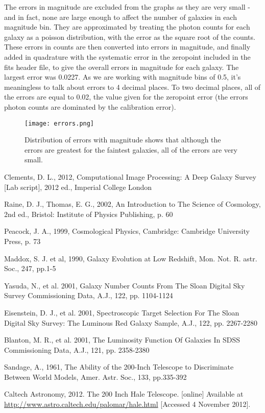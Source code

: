 \documentclass[a4paper,11pt,twoside]{article}
\begin{document}
The errors in magnitude are excluded from the graphs as they are very small - and in fact, none are large enough to affect the number of galaxies in each magnitude bin. 
They are approximated by treating the photon counts for each galaxy as a poisson distribution, with the error as the square root of the counts. These errors in counts are then converted into errors in magnitude, and finally added in quadrature with the systematic error in the zeropoint included in the fits header file, to give the overall errors in magnitude for each galaxy. The largest error was 0.0227. As we are working with magnitude bins of 0.5, it's meaningless to talk about errors to 4 decimal places. To two decimal places, all of the errors are equal to 0.02, the value given for the zeropoint error (the errors photon counts are dominated by the calibration error).

\begin{figure}[htb]
  \centering
  \texttt{[image: errors.png]}
  \caption{Distribution of errors with magnitude shows that although 
the errors are greatest for the faintest galaxies, 
all of the errors are very small.}
  \label{fig:errors}
\end{figure}

\begin{thebibliography}{9}

Clements, D. L., 2012, Computational Image Processing: A Deep Galaxy Survey [Lab script], 2012 ed., Imperial College London

Raine, D. J., Thomas, E. G., 2002, An Introduction to The Science of Cosmology, 2nd ed., Bristol: Institute of Physics Publishing, p. 60

Peacock, J. A., 1999, Cosmological Physics, Cambridge: Cambridge University Press, p. 73

Maddox, S. J. et al, 1990, Galaxy Evolution at Low Redshift, Mon. Not. R. astr. Soc., 247, pp.1-5

Yasuda, N., et al. 2001, Galaxy Number Counts From The Sloan Digital Sky Survey Commissioning Data, A.J., 122, pp. 1104-1124

Eisenstein, D. J., et al. 2001, Spectroscopic Target Selection For The Sloan Digital Sky Survey: The Luminous Red Galaxy Sample, A.J., 122, pp. 2267-2280

Blanton, M. R., et al. 2001, The Luminosity Function Of Galaxies In SDSS Commissioning Data, A.J., 121, pp. 2358-2380

Sandage, A., 1961, The Ability of the 200-Inch Telescope to Discriminate Between World Models, Amer. Astr. Soc., 133, pp.335-392

Caltech Astronomy, 2012. The 200 Inch Hale Telescope. [online] Available at \url{http://www.astro.caltech.edu/palomar/hale.html}
[Accessed 4 November 2012].

\end{thebibliography}
\end{document}
